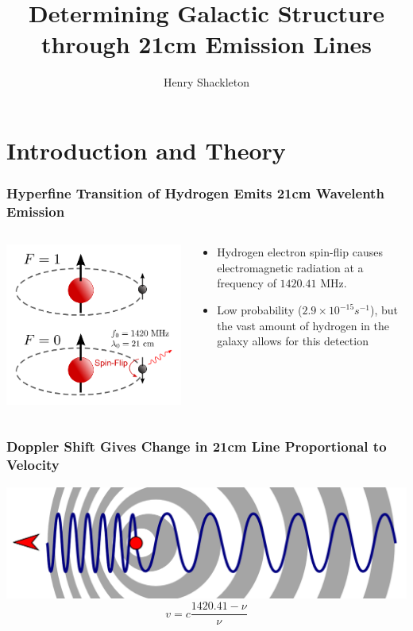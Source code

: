 \documentclass{beamer}
\title[21 cm]{Determining Galactic Structure through 21cm Emission Lines}
\author{Henry Shackleton}
\begin{document}
\titlepage

\section{Introduction and Theory}

\begin{frame}
  \frametitle{Hyperfine Transition of Hydrogen Emits 21cm Wavelenth Emission}
  \begin{columns}
    \begin{column}{0.7\textwidth}
      \begin{center}
  \includegraphics[width=0.7\linewidth]{hyperfine}
\end{center}
\end{column}
\begin{column}{0.3\textwidth}
  \begin{center}
    \begin{itemize}
      \item Hydrogen electron spin-flip causes electromagnetic radiation at a frequency of $1420.41$ MHz.
      \item Low probability ($2.9 \times 10^{-15} s^{-1}$), but the vast amount of hydrogen in the galaxy allows for this detection
    \end{itemize}\end{center}\end{column}\end{columns}
\end{frame}

\begin{frame}
  \frametitle{Doppler Shift Gives Change in 21cm Line Proportional to Velocity}
  \includegraphics[width=1\textwidth]{diagrammatic}
  \begin{equation*}
  v = c \frac{1420.41 - \nu}{\nu}
\end{equation*}
\end{frame}
\end{document}
